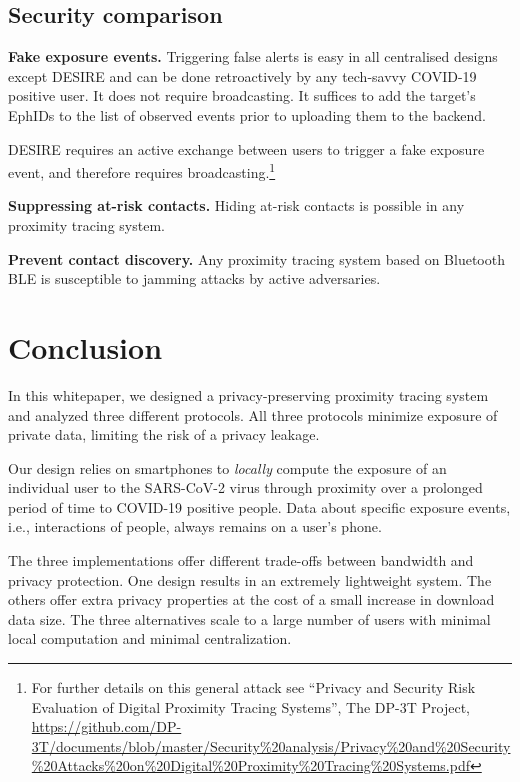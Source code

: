 \documentclass{article}
\begin{document}
\subsection{Security comparison}\label{security-comparison}

\textbf{Fake exposure events.} Triggering false alerts is easy in all
centralised designs except DESIRE and can be done retroactively by any
tech-savvy COVID-19 positive user. It does not require broadcasting. It
suffices to add the target's EphIDs to the list of observed events prior
to uploading them to the backend.

DESIRE requires an active exchange between users to trigger a fake
exposure event, and therefore requires broadcasting.\footnote{For
  further details on this general attack see ``Privacy and Security Risk
  Evaluation of Digital Proximity Tracing Systems'', The DP-3T Project,
  \href{https://github.com/DP-3T/documents/blob/master/Security\%20analysis/Privacy\%20and\%20Security\%20Attacks\%20on\%20Digital\%20Proximity\%20Tracing\%20Systems.pdf}{{https://github.com/DP-3T/documents/blob/master/Security\%20analysis/Privacy\%20and\%20Security\%20Attacks\%20on\%20Digital\%20Proximity\%20Tracing\%20Systems.pdf}}}

\textbf{Suppressing at-risk contacts.} Hiding at-risk contacts is
possible in any proximity tracing system.

\textbf{Prevent contact discovery.} Any proximity tracing system based
on Bluetooth BLE is susceptible to jamming attacks by active
adversaries.


\section{Conclusion}\label{conclusion}

In this whitepaper, we designed a privacy-preserving proximity tracing
system and analyzed three different protocols. All three protocols
minimize exposure of private data, limiting the risk of a privacy
leakage.

Our design relies on smartphones to \emph{locally} compute the exposure
of an individual user to the SARS-CoV-2 virus through proximity over a
prolonged period of time to COVID-19 positive people. Data about
specific exposure events, i.e., interactions of people, always remains
on a user's phone.

The three implementations offer different trade-offs between bandwidth
and privacy protection. One design results in an extremely lightweight
system. The others offer extra privacy properties at the cost of a small
increase in download data size. The three alternatives scale to a large
number of users with minimal local computation and minimal
centralization.
\end{document}
